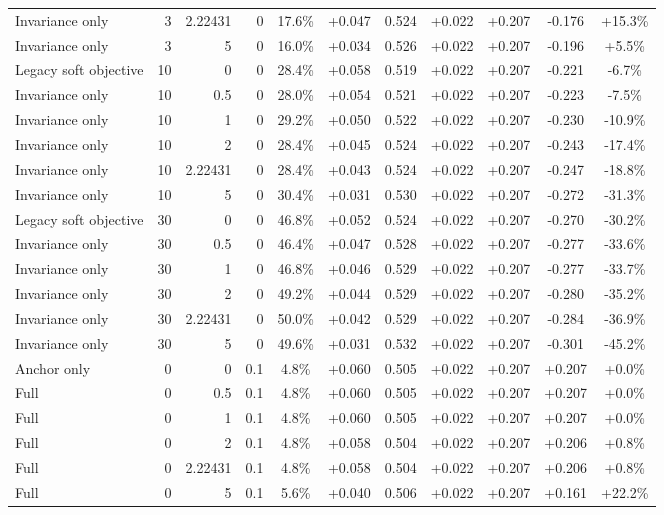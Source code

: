 \begin{table}[htbp]
\begin{tabular}{lrrrccccccc}
Invariance only & 3 & 2.22431 & 0 & 17.6\% & +0.047 & 0.524 & +0.022 & +0.207 & -0.176 & +15.3\% \\
Invariance only & 3 & 5 & 0 & 16.0\% & +0.034 & 0.526 & +0.022 & +0.207 & -0.196 & +5.5\% \\
Legacy soft objective & 10 & 0 & 0 & 28.4\% & +0.058 & 0.519 & +0.022 & +0.207 & -0.221 & -6.7\% \\
Invariance only & 10 & 0.5 & 0 & 28.0\% & +0.054 & 0.521 & +0.022 & +0.207 & -0.223 & -7.5\% \\
Invariance only & 10 & 1 & 0 & 29.2\% & +0.050 & 0.522 & +0.022 & +0.207 & -0.230 & -10.9\% \\
Invariance only & 10 & 2 & 0 & 28.4\% & +0.045 & 0.524 & +0.022 & +0.207 & -0.243 & -17.4\% \\
Invariance only & 10 & 2.22431 & 0 & 28.4\% & +0.043 & 0.524 & +0.022 & +0.207 & -0.247 & -18.8\% \\
Invariance only & 10 & 5 & 0 & 30.4\% & +0.031 & 0.530 & +0.022 & +0.207 & -0.272 & -31.3\% \\
Legacy soft objective & 30 & 0 & 0 & 46.8\% & +0.052 & 0.524 & +0.022 & +0.207 & -0.270 & -30.2\% \\
Invariance only & 30 & 0.5 & 0 & 46.4\% & +0.047 & 0.528 & +0.022 & +0.207 & -0.277 & -33.6\% \\
Invariance only & 30 & 1 & 0 & 46.8\% & +0.046 & 0.529 & +0.022 & +0.207 & -0.277 & -33.7\% \\
Invariance only & 30 & 2 & 0 & 49.2\% & +0.044 & 0.529 & +0.022 & +0.207 & -0.280 & -35.2\% \\
Invariance only & 30 & 2.22431 & 0 & 50.0\% & +0.042 & 0.529 & +0.022 & +0.207 & -0.284 & -36.9\% \\
Invariance only & 30 & 5 & 0 & 49.6\% & +0.031 & 0.532 & +0.022 & +0.207 & -0.301 & -45.2\% \\
Anchor only & 0 & 0 & 0.1 & 4.8\% & +0.060 & 0.505 & +0.022 & +0.207 & +0.207 & +0.0\% \\
Full & 0 & 0.5 & 0.1 & 4.8\% & +0.060 & 0.505 & +0.022 & +0.207 & +0.207 & +0.0\% \\
Full & 0 & 1 & 0.1 & 4.8\% & +0.060 & 0.505 & +0.022 & +0.207 & +0.207 & +0.0\% \\
Full & 0 & 2 & 0.1 & 4.8\% & +0.058 & 0.504 & +0.022 & +0.207 & +0.206 & +0.8\% \\
Full & 0 & 2.22431 & 0.1 & 4.8\% & +0.058 & 0.504 & +0.022 & +0.207 & +0.206 & +0.8\% \\
Full & 0 & 5 & 0.1 & 5.6\% & +0.040 & 0.506 & +0.022 & +0.207 & +0.161 & +22.2\% \\

\end{tabular}
\end{table}
